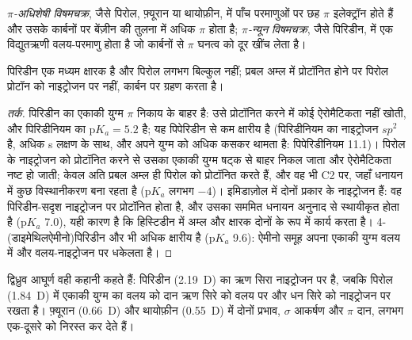 \begin{definition}[$\pi$-अधिशेषी और $\pi$-न्यून विषमचक्र]\label{def:b3:heterocycles:pi-character}
\emph{$\pi$-अधिशेषी विषमचक्र}, जैसे
पिरोल, फ़्यूरान या थायोफ़ीन, में पाँच परमाणुओं पर छह $\pi$ इलेक्ट्रॉन होते हैं और उसके
कार्बनों पर बेंज़ीन की तुलना में अधिक $\pi$  होता है; \emph{$\pi$-न्यून
विषमचक्र}, जैसे पिरिडीन, में एक
विद्युतऋणी वलय-परमाणु होता है जो कार्बनों से $\pi$ घनत्व को दूर खींच लेता है।
\end{definition}

\begin{proposition}[क्षारकता]\label{prop:b3:heterocycles:basicity}
पिरिडीन एक मध्यम क्षारक है और पिरोल लगभग बिल्कुल नहीं; प्रबल अम्ल में
प्रोटॉनित होने पर पिरोल प्रोटॉन को नाइट्रोजन पर नहीं, कार्बन पर ग्रहण करता है।
\end{proposition}

\begin{proof}[तर्क]
पिरिडीन का एकाकी युग्म $\pi$ निकाय के बाहर है: उसे प्रोटॉनित करने में कोई
ऐरोमैटिकता नहीं खोती, और पिरिडीनियम का $\mathrm pK_a = 5.2$ है; यह पिपेरिडीन से कम क्षारीय है
(पिरिडीनियम का नाइट्रोजन $sp^2$ है, अधिक s लक्षण के साथ, और अपने युग्म को अधिक
कसकर थामता है: पिपेरिडीनियम 11.1)। पिरोल के नाइट्रोजन को प्रोटॉनित करने से उसका एकाकी
युग्म षट्क से बाहर निकल जाता और ऐरोमैटिकता नष्ट हो जाती; केवल अति प्रबल अम्ल ही
पिरोल को प्रोटॉनित करते हैं, और वह भी C2 पर, जहाँ धनायन में कुछ विस्थानीकरण बना रहता है
($\mathrm pK_a$ लगभग $-4$)। इमिडाज़ोल में दोनों प्रकार के नाइट्रोजन हैं: वह
पिरिडीन-सदृश नाइट्रोजन पर प्रोटॉनित होता है, और उसका सममित धनायन अनुनाद से स्थायीकृत होता है ($\mathrm pK_a$
7.0), यही कारण है कि हिस्टिडीन  में अम्ल और क्षारक दोनों के रूप में कार्य करता है।
4-(डाइमेथिलऐमीनो)पिरिडीन और भी अधिक क्षारीय है ($\mathrm pK_a$ 9.6): ऐमीनो समूह अपना
एकाकी युग्म वलय में और वलय-नाइट्रोजन पर धकेलता है।
\end{proof}

द्विध्रुव आघूर्ण वही कहानी कहते हैं: पिरिडीन (\qty{2.19}{D}) का ऋण सिरा नाइट्रोजन पर
है, जबकि पिरोल (\qty{1.84}{D}) में एकाकी युग्म का वलय को दान ऋण सिरे को वलय पर
और धन सिरे को नाइट्रोजन पर रखता है। फ़्यूरान
(\qty{0.66}{D}) और थायोफ़ीन (\qty{0.55}{D}) में दोनों प्रभाव, $\sigma$ आकर्षण और $\pi$ दान, लगभग
एक-दूसरे को निरस्त कर देते हैं।

